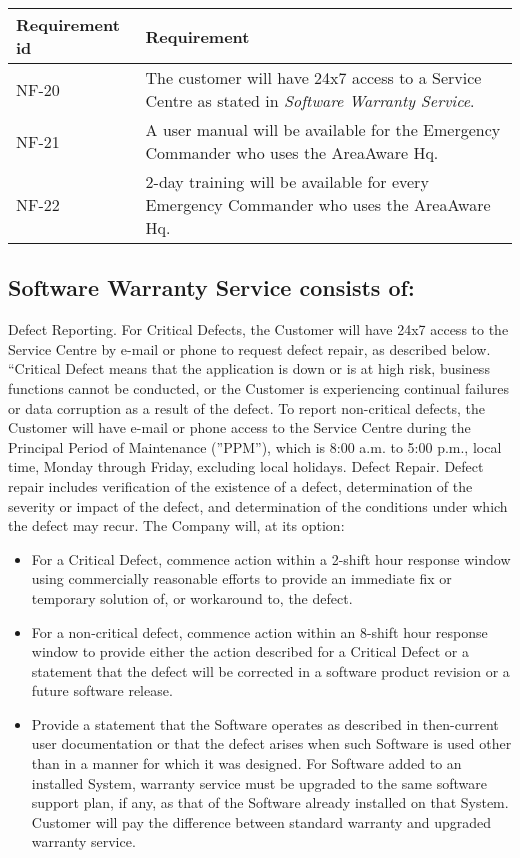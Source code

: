 \begin{longtable}{| p{3.2cm} |  p{10cm} | }
	\hline
	\textbf{Requirement id} &  \textbf{Requirement } \\
	\hline
	NF-20 &The customer will have 24x7 access to a Service Centre as stated in \emph{Software Warranty Service}.  \\
	\hline
	NF-21 & A user manual will be available for the Emergency Commander who uses the AreaAware Hq. \\
	\hline
	NF-22 & 2-day training will be available for every Emergency Commander who uses the AreaAware Hq. \\
	\hline
\end{longtable}



\subsection{Software Warranty Service consists of:}
Defect Reporting. For Critical Defects, the Customer will have 24x7 access to the Service Centre by e-mail or phone to request defect repair, as described below. “Critical Defect means that the
application is down or is at high risk, business functions cannot be conducted, or the Customer is experiencing continual failures or data corruption as a result of the defect. To report non-critical
defects, the Customer will have e-mail or phone access to the Service Centre during the Principal Period of Maintenance (”PPM”), which is 8:00 a.m. to 5:00 p.m., local time, Monday through Friday,
excluding local holidays. Defect Repair. Defect repair includes verification of the existence of a defect, determination of the
severity or impact of the defect, and determination of the conditions under which the defect may recur. 
The Company will, at its option: 
\begin{itemize}
\item For a Critical Defect, commence action within a 2-shift hour response window using commercially reasonable efforts to provide an immediate fix or temporary solution of, or workaround
to, the defect.
\item For a non-critical defect, commence action within an 8-shift hour response window to provide either the action described for a Critical Defect or a statement that the defect will be corrected
in a software product revision or a future software release.
\item Provide a statement that the Software operates as described in then-current user documentation or that the defect arises when such Software is used other than in a manner for which it
was designed. For Software added to an installed System, warranty service must be upgraded to the same software support plan, if any, as that of the Software already installed on that
System. Customer will pay the difference between standard warranty and upgraded warranty
service.
\end{itemize}


